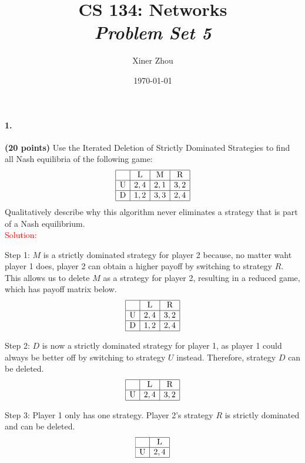 \documentclass[11pt]{article} %
\title{CS 134: Networks \\ \emph{Problem Set 5}}
\author{Xiner Zhou}
\date{\today} %
\begin{document}
 
\maketitle


\paragraph{1.} \textbf{(20 points)}  Use the Iterated Deletion of Strictly Dominated Strategies to find all Nash equilibria of the following game:
$$\begin{array} {|c|c|c|c|} \hline
& \text{L} & \text{M} & \text {R}\\ \hline
\text{U} & 2,4 & 2,1 & 3,2 \\ \hline
\text{D} & 1,2 & 3,3 & 2,4 \\ \hline
\end{array}$$
Qualitatively describe why this algorithm never eliminates a strategy that is part of a Nash equilibrium.\\

\textcolor{red}{Solution:}

Step 1: $M$ is a strictly dominated strategy for player 2 because, no matter waht player 1 does, player 2 can obtain a higher payoff by switching to strategy $R$. This allows us to delete $M$ as a strategy for player 2, resulting in a reduced game, which has payoff matrix below.
$$\begin{array} {|c|c|c|c|} \hline
& \text{L} & \text {R}\\ \hline
\text{U} & 2,4 & 3,2 \\ \hline
\text{D} & 1,2 & 2,4 \\ \hline
\end{array}$$

Step 2: $D$ is now a strictly dominated strategy for player 1, as player 1 could always be better off by switching to strategy $U$ instead. Therefore, strategy $D$ can be deleted.
$$\begin{array} {|c|c|c|c|} \hline
& \text{L} & \text {R}\\ \hline
\text{U} & 2,4 & 3,2 \\ \hline
\end{array}$$

Step 3: Player 1 only has one strategy. Player 2's strategy $R$ is strictly dominated and can be deleted. 
$$\begin{array} {|c|c|c|c|} \hline
& \text{L}  \\ \hline
\text{U} & 2,4 \\ \hline
\end{array}$$
\end{document}
